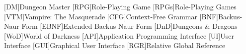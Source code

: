 [DM]{Dungeon Master}
[RPG]{Role-Playing Game}
[RPGs]{Role-Playing Games}
[VTM]{Vampire: The Masquerade}
[CFG]{Context-Free Grammar}
[BNF]{Backus-Naur Form}
[EBNF]{Extended Backus-Naur Form}
[DnD]{Dungeons \& Dragons}
[WoD]{World of Darkness}
[API]{Application Programming Interface}
[UI]{User Interface}
[GUI]{Graphical User Interface}
[RGR]{Relative Global Reference}